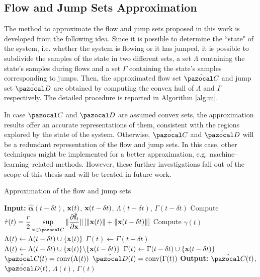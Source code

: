 \subsection{Flow and Jump Sets Approximation}
The method to approximate the flow and jump sets proposed in this work is developed from the following idea. Since it is possible to determine the ``state" of the system, i.e.  whether the system is flowing or it has jumped, it is possible to subdivide the samples of the state in two different sets, a set $\Lambda$ containing the state's samples during flows and a set $\Gamma$ containing the state's samples corresponding to jumps. Then, the approximated flow set $\hat{\C}$ and jump set $\hat{\D}$ are obtained by computing the convex hull of $\Lambda$ and $\Gamma$ respectively. The detailed procedure is reported in Algorithm \ref{alg:m}.%
{%
\begin{rem}
In case $\C$ and $\D$ are assumed convex sets, the approximation results offer an accurate representations of them, consistent with the regions explored by the state of the system. Otherwise, $\hat{\C}$ and $\hat{\D}$ will be a redundant representation of the flow and jump sets. In this case, other techniques might be implemented for a better approximation, e.g. machine--learning--related methods. However, these further investigations fall out of the scope of this thesis and will be treated in future work.
\end{rem}
}
\begin{algorithm}[!t]
	\caption{Approximation of the flow and jump sets}\label{alg:m}
	\begin{algorithmic}[1]
		\State \textbf{Input:} $\hat{\bm{\alpha}}(t-\delta t)$, $\mathbf{x}(t)$, $\mathbf{x}(t-\delta t)$, $\Lambda(t-\delta t)$, $\Gamma(t-\delta t)$
		\State Compute $\hat{\tau}(t)=\dfrac{r}{2}\sup\limits_{\x\in\hat{\C}}\|\dfrac{\partial \hat{\mathbf{f}}_t}{\partial\x}\|\left[\|\x(t)\|+\|\x(t-\delta t)\|\right]$
		\State Compute $\gamma(t)$
		\State $\Lambda(t)\gets\Lambda(t-\delta t)\cup\{\mathbf{x}(t)\}$
		\State $\Gamma(t)\gets\Gamma(t-\delta t)$
		\Else
		\State $\Lambda(t)\gets\Lambda(t-\delta t)\cup\{\mathbf{x}(t)\}\backslash\{\mathbf{x}(t-\delta t)\}$
		\State $\Gamma(t)\gets\Gamma(t-\delta t)\cup\{\mathbf{x}(t-\delta t)\}$
		\EndIf
		\State $\hat{\C}(t) = \conv(\Lambda(t))$
        \State $\hat{\D}(t)=\conv(\Gamma(t))$
		\State \textbf{Output:} $\hat{\C}(t)$, $\hat{\D}(t)$, $\Lambda(t)$, $\Gamma(t)$
		\vspace{-5mm}
	\end{algorithmic}
	\vspace{5mm}
\end{algorithm}

